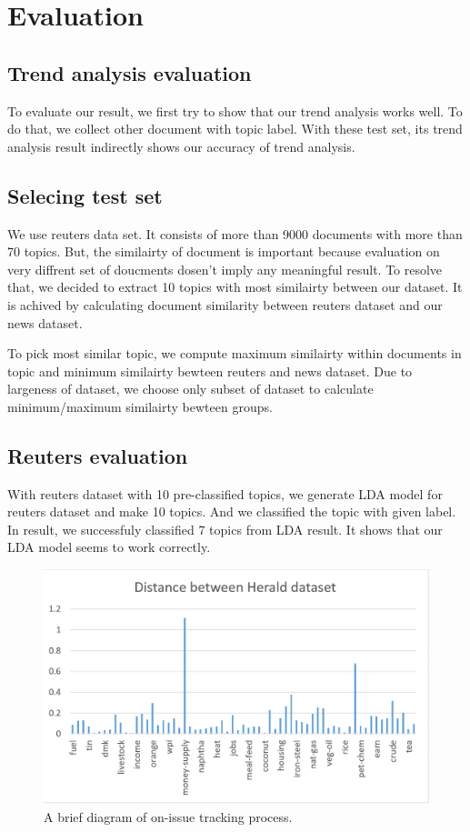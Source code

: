 \section{Evaluation}

\subsection{Trend analysis evaluation}
To evaluate our result, we first try to show that our trend analysis
works well. To do that, we collect other document with topic label.
With these test set, its trend analysis result indirectly shows our
accuracy of trend analysis.
\subsection{Selecing test set}
We use reuters data set. It consists of more than 9000 documents
with more than 70 topics. But, the similairty of document is important
because evaluation on very diffrent set of doucments dosen't imply
any meaningful result. To resolve that, we decided to extract 10 topics
with most similairty between our dataset. It is achived by calculating
document similarity between reuters dataset and our news dataset.

To pick most similar topic, we compute maximum similairty within documents
in topic and minimum similairty bewteen reuters and news dataset. Due to
largeness of dataset, we choose only subset of dataset to calculate
minimum/maximum similairty bewteen groups.

\subsection{Reuters evaluation}
With reuters dataset with 10 pre-classified topics, we generate LDA
model for reuters dataset and make 10 topics. And we classified the topic
with given label. In result, we successfuly classified 7 topics from
LDA result. It shows that our LDA model seems to work correctly.

\begin{figure}[!htbp]
  \centering
  \includegraphics[width=0.8\linewidth]{Distance1}
  \caption{A brief diagram of on-issue tracking process.}
  \label{fig:onissuedia}
\end{figure}

